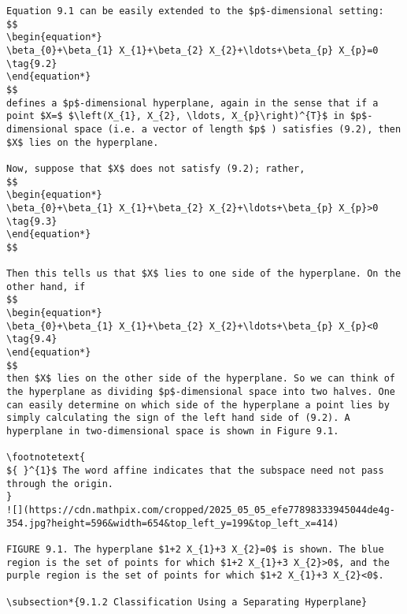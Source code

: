 \documentclass[10pt]{article}
\let\svthefootnote\thefootnote
\newcommand\blfootnotetext[1]{%
  \let\thefootnote\relax\footnote{#1}%
  \addtocounter{footnote}{-1}%
  \let\thefootnote\svthefootnote%
}
\let\svfootnotetext\footnotetext
\renewcommand\footnotetext[2][?]{%
  \if\relax#1\relax%
    \ifnum\value{footnote}=0\blfootnotetext{#2}\else\svfootnotetext{#2}\fi%
  \else%
    \if?#1\ifnum\value{footnote}=0\blfootnotetext{#2}\else\svfootnotetext{#2}\fi%
    \else\svfootnotetext[#1]{#2}\fi%
  \fi
}
\begin{document}
\begin{verbatim}
Equation 9.1 can be easily extended to the $p$-dimensional setting:
$$
\begin{equation*}
\beta_{0}+\beta_{1} X_{1}+\beta_{2} X_{2}+\ldots+\beta_{p} X_{p}=0 \tag{9.2}
\end{equation*}
$$
defines a $p$-dimensional hyperplane, again in the sense that if a point $X=$ $\left(X_{1}, X_{2}, \ldots, X_{p}\right)^{T}$ in $p$-dimensional space (i.e. a vector of length $p$ ) satisfies (9.2), then $X$ lies on the hyperplane.

Now, suppose that $X$ does not satisfy (9.2); rather,
$$
\begin{equation*}
\beta_{0}+\beta_{1} X_{1}+\beta_{2} X_{2}+\ldots+\beta_{p} X_{p}>0 \tag{9.3}
\end{equation*}
$$

Then this tells us that $X$ lies to one side of the hyperplane. On the other hand, if
$$
\begin{equation*}
\beta_{0}+\beta_{1} X_{1}+\beta_{2} X_{2}+\ldots+\beta_{p} X_{p}<0 \tag{9.4}
\end{equation*}
$$
then $X$ lies on the other side of the hyperplane. So we can think of the hyperplane as dividing $p$-dimensional space into two halves. One can easily determine on which side of the hyperplane a point lies by simply calculating the sign of the left hand side of (9.2). A hyperplane in two-dimensional space is shown in Figure 9.1.

\footnotetext{
${ }^{1}$ The word affine indicates that the subspace need not pass through the origin.
}
![](https://cdn.mathpix.com/cropped/2025_05_05_efe77898333945044de4g-354.jpg?height=596&width=654&top_left_y=199&top_left_x=414)

FIGURE 9.1. The hyperplane $1+2 X_{1}+3 X_{2}=0$ is shown. The blue region is the set of points for which $1+2 X_{1}+3 X_{2}>0$, and the purple region is the set of points for which $1+2 X_{1}+3 X_{2}<0$.

\subsection*{9.1.2 Classification Using a Separating Hyperplane}


\end{verbatim}
\end{document}

